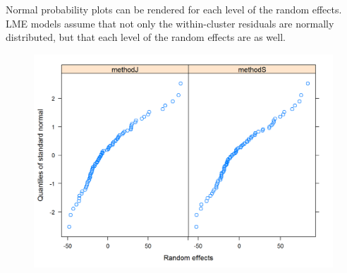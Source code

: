 \documentclass[12pt, a4paper]{report}
\theoremstyle{plain}
\theoremstyle{definition}
\theoremstyle{remark}
\begin{document}
	Normal probability plots can be rendered for each level of the random effects.  LME models assume that not only the within-cluster residuals are normally distributed, but that each level of the random effects are as well. %
	\begin{figure}[h!]
		\centering
		\includegraphics[width=0.9\linewidth]{images/ResidPlot2}
		\caption{}
		\label{fig:ResidPlot2}
	\end{figure}




%
%
%
%









\end{document}
